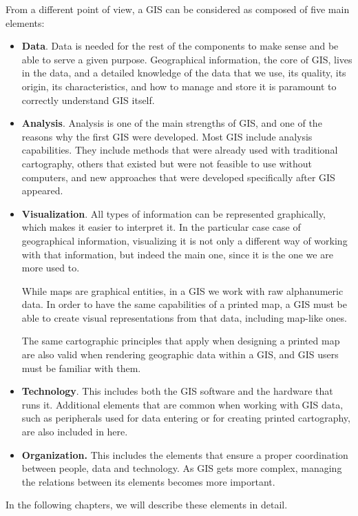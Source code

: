 From a different point of view, a GIS can be considered as composed of five main elements:


\begin{itemize}
\item \textbf{Data}. Data is needed for the rest of the components to make sense and be able to serve a given purpose. Geographical information, the core of GIS, lives in the data, and a detailed knowledge of the data that we use, its quality, its origin, its characteristics, and how to manage and store it is paramount to correctly understand GIS itself.
\item \textbf{Analysis}. Analysis is one of the main strengths of GIS, and one of the reasons why the first GIS were developed. Most GIS include analysis capabilities. They include methods that were already used with traditional cartography, others that existed but were not feasible to use without computers, and new approaches that were developed specifically after GIS appeared.
\item \textbf{Visualization}. All types of information can be represented graphically, which makes it easier to interpret it. In the particular case case of geographical information, visualizing it is not only a different way of working with that information, but indeed the main one, since it is the one we are more used to.

While maps are graphical entities, in a GIS we work with raw alphanumeric data. In order to have the same capabilities of a printed map, a GIS must be able to create visual representations from that data, including map-like ones.

The same cartographic principles that apply when designing a printed map are also valid when rendering geographic data within a GIS, and GIS users must be familiar with them. 
\item \textbf{Technology}. This includes both the GIS software and the hardware that runs it. Additional elements that are common when working with GIS data, such as peripherals used for data entering or for creating printed cartography, are also included in here.
\item \textbf{Organization.} This includes the elements that ensure a proper coordination between people, data and technology. As GIS gets more complex, managing the relations between its elements becomes more important.
\end{itemize}

In the following chapters, we will describe these elements in detail.

\pagestyle{empty}